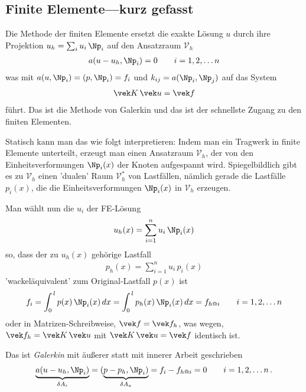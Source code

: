 \textcolor{blau2}{\subsection{Finite Elemente---kurz gefasst}}
Die Methode der finiten Elemente ersetzt die exakte L\"{o}sung $u$ durch ihre Projektion $u_h = \sum_i u_i\,\Np_i$ auf den Ansatzraum $\mathcal{V}_h$
\begin{align}
a(u - u_h,\Np_i) = 0 \qquad i = 1,2, \ldots n
\end{align}
was mit $a(u,\Np_i) = (p, \Np_i) = f_i$ und $k_{ij} = a(\Np_i,\Np_j)$ auf das System
\begin{align}
\vek K\,\vek u = \vek f
\end{align}
f\"{u}hrt. Das ist die Methode von Galerkin und das ist der schnellste Zugang zu den finiten Elementen.

Statisch kann man das wie folgt interpretieren: Indem man ein Tragwerk in finite Elemente unterteilt, erzeugt man einen Ansatzraum $\mathcal{V}_h$, der von den Einheitsverformungen $\Np_i(x)$ der Knoten aufgespannt wird. Spiegelbildlich gibt es zu $\mathcal{V}_h$ einen 'dualen' Raum $\mathcal{V}_h^*$ von Lastf\"{a}llen, n\"{a}mlich gerade die Lastf\"{a}lle $p_i(x)$, die die Einheitsverformungen $\Np_i(x)$ in $\mathcal{V}_h$ erzeugen.

Man w\"{a}hlt nun die $u_i$ der FE-L\"{o}sung
\begin{align}
u_h(x) = \sum_{i = 1}^n u_i\,\Np_i(x)
\end{align}
so, dass der zu $u_h(x)$ geh\"{o}rige Lastfall
\begin{align}
p_h(x) = \sum_{i = 1}^n u_i\,p_i(x)
\end{align}
'wackel\"{a}quivalent' zum Original-Lastfall $p(x)$ ist
\begin{align}
f_i = \int_0^{\,l} p(x)\,\Np_i(x)\,dx = \int_0^{\,l} p_h(x)\,\Np_i(x)\,dx = f_{h @i}\qquad i = 1,2, \ldots n
\end{align}
oder in Matrizen-Schreibweise, $\vek f = \vek f_h$, was wegen, $\vek f_h = \vek K\,\vek u$ mit $\vek K\,\vek u = \vek f$ identisch ist.

Das ist {\em Galerkin\/} mit \"{a}u{\ss}erer statt mit innerer Arbeit geschrieben
\begin{align}
\underbrace{a(u - u_h,\Np_i)}_{\delta A_i} = (\underbrace{p - p_h,\Np_i)}_{\delta A_a} = f_i - f_{h @i} = 0\qquad i = 1,2, \ldots n\,.
\end{align}


